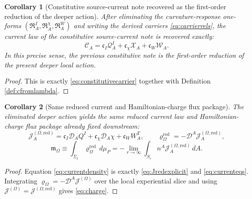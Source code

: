 \documentclass[11pt]{article}
\newcommand{\SpatialD}{\mathcal D}
\newcommand{\SourceDensity}{\varrho_\Omega}
\newcommand{\SourceDensityRed}{\varrho_\Omega^{\mathrm{red}}}
\newcommand{\SourceCurrent}{\mathcal J^{(\Omega)}}
\newcommand{\SourceCurrentRed}{\mathcal J^{(\Omega,\mathrm{red})}}
\newcommand{\ConstCurrent}{\mathcal C}
\newcommand{\QCarrier}{\mathcal Q}
\newcommand{\ChiCarrier}{\mathcal X}
\newcommand{\TransCarrier}{\mathcal W}
\newcommand{\HamChargeOmega}{\mathfrak m_\Omega}
\newtheorem{corollary}{Corollary}
\begin{document}
\begin{corollary}[Constitutive source-current note recovered as the first-order reduction of the deeper action]
\label{cor:firstorder}
After eliminating the curvature-response one-forms \((\mathfrak R_A^I,\mathfrak R_A^\chi,\mathfrak R_A^W)\) and writing the derived carriers \eqref{eq:carrierrels}, the current law of the constitutive source-current note is recovered exactly:
\begin{equation}
\ConstCurrent_A
=
\mathfrak c_I\QCarrier_A^I
+\mathfrak c_\chi\ChiCarrier_A
+\mathfrak c_W\TransCarrier_A.
\label{eq:oldconstrecovered}
\end{equation}
In this precise sense, the previous constitutive note is the first-order reduction of the present deeper local action.
\end{corollary}

\begin{proof}
This is exactly \eqref{eq:constitutivecarrier} together with Definition \ref{def:cfromlambda}.
\end{proof}

\begin{corollary}[Same reduced current and Hamiltonian-charge flux package]
\label{cor:currentflux}
The eliminated deeper action yields the same reduced current law and Hamiltonian-charge flux package already fixed downstream:
\begin{equation}
\SourceCurrentRed_A
=
\mathfrak c_I\SpatialD_AQ^I
+\mathfrak c_\chi\SpatialD_A\chi
+\mathfrak c_WW_A^T,
\qquad
\SourceDensityRed=-\SpatialD^A\SourceCurrentRed_A,
\label{eq:currentdensity}
\end{equation}
\begin{equation}
\HamChargeOmega
\equiv
\int_{\Sigma_t}\SourceDensityRed\,d\mu_P
=
-\lim_{r\to\infty}\int_{S_r}n^A\SourceCurrentRed_A\,dA.
\label{eq:charge}
\end{equation}
\end{corollary}

\begin{proof}
Equation \eqref{eq:currentdensity} is exactly \eqref{eq:Jredexplicit} and \eqref{eq:currenteqs}. Integrating \(\SourceDensity=-\SpatialD^A\SourceCurrent\) over the local experiential slice and using \(\SourceCurrent=\SourceCurrentRed\) gives \eqref{eq:charge}.
\end{proof}
\end{document}
